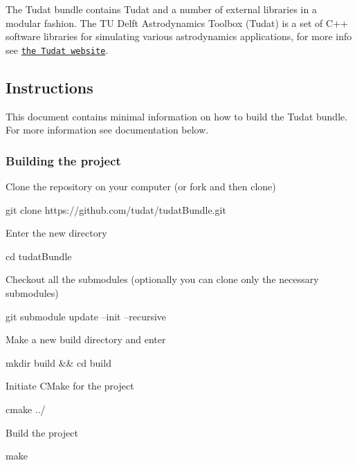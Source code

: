 The Tudat bundle contains Tudat and a number of external libraries in a modular fashion. The TU Delft Astrodynamics Toolbox (Tudat) is a set of C++ software libraries for simulating various astrodynamics applications, for more info see \href{http://tudat.tudelft.nl}{\tt the Tudat website}.

\subsection*{Instructions}

This document contains minimal information on how to build the Tudat bundle. For more information see documentation below.

\subsubsection*{Building the project}


\begin{DoxyEnumerate}
\item Clone the repository on your computer (or fork and then clone) \begin{DoxyVerb} git clone https://github.com/tudat/tudatBundle.git
\end{DoxyVerb}

\item Enter the new directory \begin{DoxyVerb} cd tudatBundle
\end{DoxyVerb}

\item Checkout all the submodules (optionally you can clone only the necessary submodules) \begin{DoxyVerb} git submodule update --init --recursive
\end{DoxyVerb}

\item Make a new build directory and enter \begin{DoxyVerb} mkdir build && cd build
\end{DoxyVerb}

\item Initiate C\+Make for the project \begin{DoxyVerb} cmake ../
\end{DoxyVerb}

\item Build the project \begin{DoxyVerb} make
\end{DoxyVerb}

\end{DoxyEnumerate}

